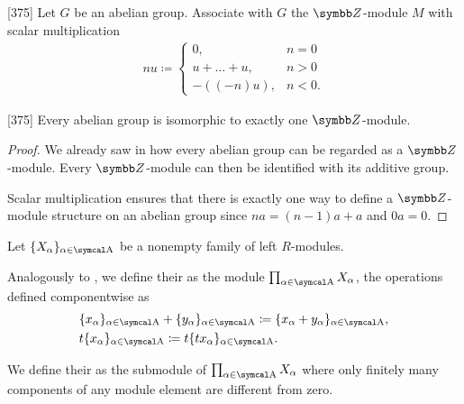 \begin{definition}\label{def:abelian_group_z_module}\cite{Knapp2016BAlg}[375]
  Let \( G \) be an abelian group. Associate with \( G \) the \( \BZ \)-module \( M \) with scalar multiplication
  \begin{align*}
    nu \coloneqq \begin{cases}
      0, &n = 0 \\
      u + \ldots + u, &n > 0 \\
      -((-n)u), &n < 0.
    \end{cases}
  \end{align*}
\end{definition}

\begin{proposition}\label{thm:abelian_group_iff_z_module}\cite{Knapp2016BAlg}[375]
  Every abelian group is isomorphic to exactly one \( \BZ \)-module.
\end{proposition}
\begin{proof}
  We already saw in  how every abelian group can be regarded as a \( \BZ \)-module. Every \( \BZ \)-module can then be identified with its additive group.

  Scalar multiplication ensures that there is exactly one way to define a \( \BZ \)-module structure on an abelian group since \( na = (n-1)a + a \) and \( 0a = 0 \).
\end{proof}

\begin{definition}\label{def:left_module_direct_product}
  Let \( \{ X_\al \}_{\al \in \CA} \) be a nonempty family of left \( R \)-modules.

  Analogously to , we define their  as the module \( \prod_{\al \in \CA} X_\al \), the operations defined componentwise as
  \begin{align*}
    &\{ x_\al \}_{\al \in \CA} + \{ y_\al \}_{\al \in \CA}
    \coloneqq
    \{ x_\al + y_\al \}_{\al \in \CA}, \\
    &t \{ x_\al \}_{\al \in \CA}
    \coloneqq
    t \{ t x_\al \}_{\al \in \CA}.
  \end{align*}

  We define their  as the submodule of \( \prod_{\al \in \CA} X_\al \) where only finitely many components of any module element are different from zero.
\end{definition}

